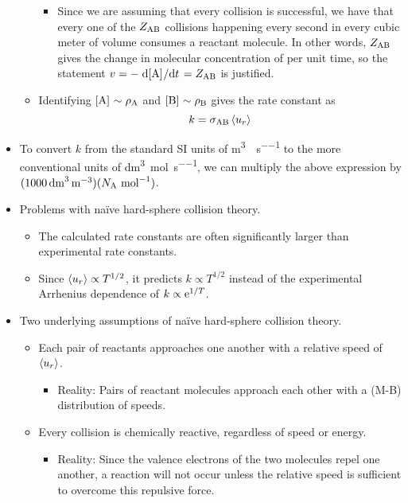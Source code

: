 \documentclass[../notes.tex]{subfiles}
\begin{document}
\begin{itemize}
\begin{itemize}
\begin{itemize}
            \item Since we are assuming that every collision is successful, we have that every one of the $Z_{\ce{A}\ce{B}}$ collisions happening every second in every cubic meter of volume consumes a reactant molecule. In other words, $Z_{\ce{A}\ce{B}}$ gives the change in molecular concentration of  per unit time, so the statement $v=-\dv*{\cnc{A}}{t}=Z_{\ce{A}\ce{B}}$ is justified.
        \end{itemize}
        \item Identifying $\cnc{A}\sim\rho_{\ce{A}}$ and $\cnc{B}\sim\rho_{\ce{B}}$ gives the rate constant as
        \begin{equation*}
            k = \sigma_{\ce{A}\ce{B}}\prb{u_r}
        \end{equation*}
    \end{itemize}
    \item To convert $k$ from the standard SI units of \si{\cubic\meter\per\molecule\per\second} to the more conventional units of \si{\cubic\deci\meter\per\mole\per\second}, we can multiply the above expression by $(\SI{1000}{\cubic\deci\meter\per\cubic\meter})(\NA\ \si{\per\mole})$.
    \item Problems with na\"{i}ve hard-sphere collision theory.
    \begin{itemize}
        \item The calculated rate constants are often significantly larger than experimental rate constants.
        \item Since $\prb{u_r}\propto T^{1/2}$, it predicts $k\propto T^{1/2}$ instead of the experimental Arrhenius dependence of $k\propto\e[1/T]$.
    \end{itemize}
    \item Two underlying assumptions of na\"{i}ve hard-sphere collision theory.
    \begin{itemize}
        \item Each pair of reactants approaches one another with a relative speed of $\prb{u_r}$.
        \begin{itemize}
            \item Reality: Pairs of reactant molecules approach each other with a (M-B) distribution of speeds.
        \end{itemize}
        \item Every collision is chemically reactive, regardless of speed or energy.
        \begin{itemize}
            \item Reality: Since the valence electrons of the two molecules repel one another, a reaction will not occur unless the relative speed is sufficient to overcome this repulsive force.

\end{itemize}
\end{itemize}
\end{itemize}
\end{document}
